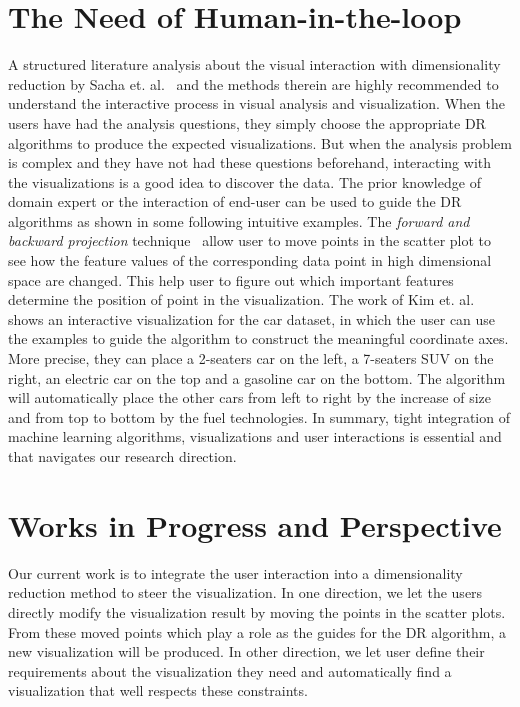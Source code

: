 \section{The Need of Human-in-the-loop}
A structured literature analysis about the visual interaction with dimensionality reduction by Sacha et. al.~\cite{Sacha2017Interaction} and the methods therein are highly recommended to understand the interactive process in visual analysis and visualization.
When the users have had the analysis questions, they simply choose the appropriate DR algorithms to produce the expected visualizations.
But when the analysis problem is complex and they have not had these questions beforehand, interacting with the visualizations is a good idea to discover the data.
The prior knowledge of domain expert or the interaction of end-user can be used to guide the DR algorithms as shown in some following intuitive examples.
The \emph{forward and backward projection} technique~\cite{cavallo2017FWBW} allow user to move points in the scatter plot to see how the feature values of the corresponding data point in high dimensional space are changed. This help user to figure out which important features determine the position of point in the visualization.
The work of Kim et. al. \cite{Kim2016InterAxis} shows an interactive visualization for the car dataset, in which the user can use the examples to guide the algorithm to construct the meaningful coordinate axes.
More precise, they can place a 2-seaters car on the left, a 7-seaters SUV on the right, an electric car on the top and a gasoline car on the bottom. The algorithm will automatically place the other cars from left to right by the increase of size and from top to bottom by the fuel technologies.
In summary, tight integration of machine learning algorithms, visualizations and user interactions is essential and that navigates our research direction.


\section{Works in Progress and Perspective}

Our current work is to integrate the user interaction into a dimensionality reduction method to steer the visualization.
In one direction, we let the users directly modify the visualization result by moving the points in the scatter plots.
From these moved points which play a role as the guides for the DR algorithm, a new visualization will be produced.
In other direction, we let user define their requirements about the visualization they need and automatically find a visualization that well respects these constraints.

